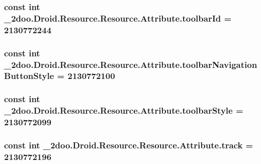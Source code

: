 \hypertarget{class__2doo_1_1_droid_1_1_resource_1_1_attribute_069cb67a1ac43cc7bce7afbe251f6fd7}{
\subsubsection[{toolbarId}]{\setlength{\rightskip}{0pt plus 5cm}const int \_\-2doo.Droid.Resource.Resource.Attribute.toolbarId = 2130772244}}
\label{class__2doo_1_1_droid_1_1_resource_1_1_attribute_069cb67a1ac43cc7bce7afbe251f6fd7}


\hypertarget{class__2doo_1_1_droid_1_1_resource_1_1_attribute_5742d7a45606f59a40e34eb41781390b}{
\subsubsection[{toolbarNavigationButtonStyle}]{\setlength{\rightskip}{0pt plus 5cm}const int \_\-2doo.Droid.Resource.Resource.Attribute.toolbarNavigationButtonStyle = 2130772100}}
\label{class__2doo_1_1_droid_1_1_resource_1_1_attribute_5742d7a45606f59a40e34eb41781390b}


\hypertarget{class__2doo_1_1_droid_1_1_resource_1_1_attribute_28d68d943d944c7665cc2ae3421f0ef0}{
\subsubsection[{toolbarStyle}]{\setlength{\rightskip}{0pt plus 5cm}const int \_\-2doo.Droid.Resource.Resource.Attribute.toolbarStyle = 2130772099}}
\label{class__2doo_1_1_droid_1_1_resource_1_1_attribute_28d68d943d944c7665cc2ae3421f0ef0}


\hypertarget{class__2doo_1_1_droid_1_1_resource_1_1_attribute_c7f57f4a84dcc71afa8dc8cefd940991}{
\subsubsection[{track}]{\setlength{\rightskip}{0pt plus 5cm}const int \_\-2doo.Droid.Resource.Resource.Attribute.track = 2130772196}}
\label{class__2doo_1_1_droid_1_1_resource_1_1_attribute_c7f57f4a84dcc71afa8dc8cefd940991}


